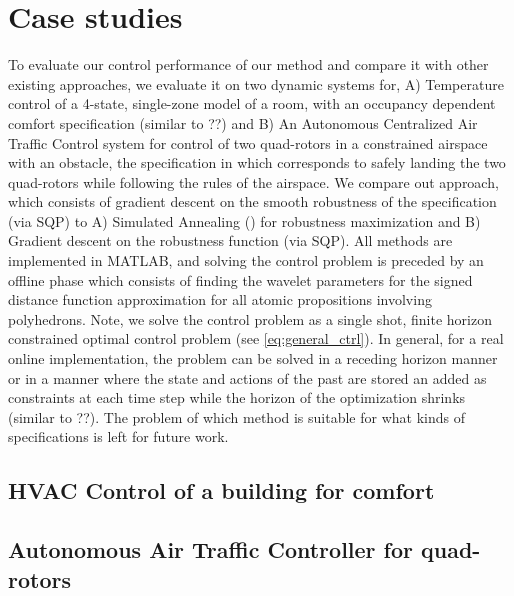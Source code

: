 \section{Case studies}
\label{sec:case study}

To evaluate our control performance of our method and compare it with other existing approaches, we evaluate it on two dynamic systems for, A) Temperature control of a 4-state, single-zone model of a room, with an occupancy dependent comfort specification (similar to \cite{}??) and B) An Autonomous Centralized Air Traffic Control system for control of two quad-rotors in a constrained airspace with an obstacle, the specification in which corresponds to safely landing the two quad-rotors while following the rules of the airspace. We compare out approach, which consists of gradient descent on the smooth robustness of the specification (via SQP) to A) Simulated Annealing (\cite{}) for robustness maximization and B) Gradient descent on the robustness function (via SQP). 
All methods are implemented in MATLAB, and solving the control problem is preceded by an offline phase which consists of finding the wavelet parameters for the signed distance function approximation for all atomic propositions involving polyhedrons. Note, we solve the control problem as a single shot, finite horizon constrained optimal control problem (see \eqref{eq:general_ctrl}). In general, for a real online implementation, the problem can be solved in a receding horizon manner or in a manner where the state and actions of the past are stored an added as constraints at each time step while the horizon of the optimization shrinks (similar to \cite{}??). The problem of which method is suitable for what kinds of specifications is left for future work.



\subsection{HVAC Control of a building for comfort}



\subsection{Autonomous Air Traffic Controller for quad-rotors}


